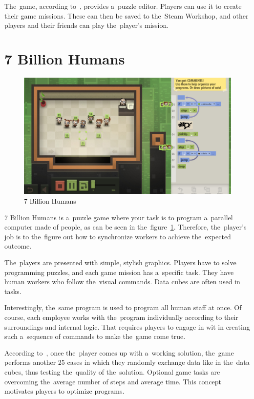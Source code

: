 The~game, according to~\cite{a2022_zachtronics}, provides a~puzzle editor.
Players can use it to create their game missions.
These can then be saved to the~Steam Workshop, and other players and their friends can play the~player's mission.

\pagebreak
\section{7 Billion Humans}
\label{similar-games:7-billion-humans}

\begin{figure}
    \centering
    \includegraphics[width=1\linewidth]{assets/similar-games/7bilionhumans.jpg}
    \caption{7 Billion Humans~\cite{a2022_tomorrow}}
    \label{fig:7bilionhumans}
\end{figure}

7 Billion Humans is a~puzzle game where your task is to program a~parallel computer made of people, as can be seen in the~figure~\ref{fig:7bilionhumans}.
Therefore, the~player's job is to the~figure out how to synchronize workers to achieve the~expected outcome.

The~players are presented with simple, stylish graphics.
Players have to solve programming puzzles, and each game mission has a~specific task.
They have human workers who follow the~visual commands.
Data cubes are often used in tasks.

Interestingly, the~same program is used to program all human staff at once.
Of course, each employee works with the~program individually according to their surroundings and internal logic.
That requires players to engage in wit in creating such a~sequence of commands to make the~game come true.

According to~\cite{a2022_tomorrow}, once the~player comes up with a~working solution, the~game performs another 25 cases in which they randomly exchange data like in the~data cubes, thus testing the~quality of the~solution.
Optional game tasks are overcoming the~average number of steps and average time.
This concept motivates players to optimize programs.

